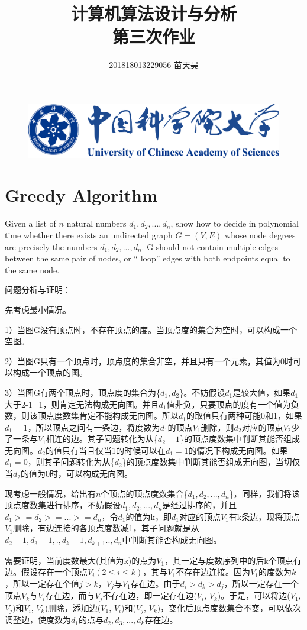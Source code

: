 \documentclass[12pt]{ctexart}
\title{计算机算法设计与分析\\ 第三次作业}
\author{201818013229056 苗天昊}
\begin{document}
\begin{figure}
\centering
\includegraphics[scale=0.12]{ucas_logo.pdf}
\end{figure}

\maketitle
\section{Greedy Algorithm}
Given a list of $n$ natural numbers $d_1, d_2,...,d_n$, show how to decide in polynomial time whether there exists an undirected graph $G = (V, E)$ whose node degrees are precisely the numbers $d_1, d_2,...,d_n$. G should not contain multiple edges between the same pair of nodes, or “ loop” edges with both endpoints equal to the same node.
\par 问题分析与证明：
\par 先考虑最小情况。
\par 1）当图G没有顶点时，不存在顶点的度。当顶点度的集合为空时，可以构成一个空图。
\par 2）当图G只有一个顶点时，顶点度的集合非空，并且只有一个元素，其值为0时可以构成一个顶点的图。
\par 3）当图G有两个顶点时，顶点度的集合为\{$d_1, d_2$\}。不妨假设$d_1$是较大值，如果$d_1$大于2-1=1，则肯定无法构成无向图。并且$d_1$值非负，只要顶点的度有一个值为负数，则该顶点度数集肯定不能构成无向图。所以$d_1$的取值只有两种可能0和1，如果$d_1=1$，所以顶点之间有一条边，将度数为$d_1$的顶点$V_1$删除，则$d_2$对应的顶点$V_2$少了一条与$V_1$相连的边。其子问题转化为从\{$d_2-1$\}的顶点度数集中判断其能否组成无向图。$d_2$的值只有当且仅当1的时候可以在$d_1=1$的情况下构成无向图。如果$d_1=0$，则其子问题转化为从\{$d_2$\}的顶点度数集中判断其能否组成无向图，当切仅当$d_2$的值为0时，可以构成无向图。
\par 现考虑一般情况，给出有$n$个顶点的顶点度数集合\{$d_1, d_2,...,d_n$\}，同样，我们将该顶点度数集进行排序，不妨假设$d_1, d_2,...,d_n$是经过排序的，并且$d_1>=d_2>=...>=d_n$，令$d_1$的值为k，即$d_1$对应的顶点$V_1$有k条边，现将顶点$V_1$删除，有边连接的各顶点度数减1，其子问题就是从$d_2-1,d_3-1,.,d_k-1,d_{k+1}..,d_n$中判断其能否构成无向图。
\par 需要证明，当前度数最大(其值为k)的点为$V_1$，其一定与度数序列中的后k个顶点有边。假设存在一个顶点$V_i$$(2\leq i \leq k)$，其与$V_1$不存在边连接。因为$V_1$的度数为$k$，所以一定存在个值$j>k$，$V_j$与$V_1$存在边。由于$d_i>d_k>d_j$，所以一定存在一个顶点$V_k$与$V_i$存在边，而与$V_j$不存在边，即一定存在边($V_i$, $V_k$)。于是，可以将边($V_1$, $V_j$)和$V_i$, $V_k$)删除，添加边($V_1$, $V_i$)和($V_j$, $V_k$)，变化后顶点度数集合不变，可以依次调整边，使度数为$d_1$的点与$d_2,d_3,...,d_k$存在边。
\end{document}
